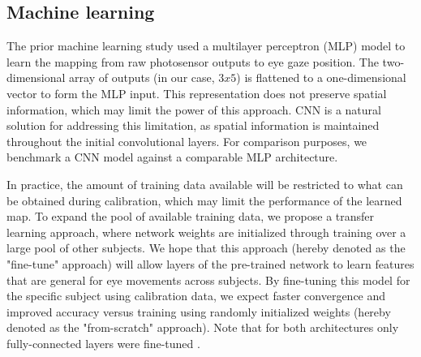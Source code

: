 


\subsection{Machine learning}\label{ssec:ml}

The prior machine learning study used a multilayer perceptron (MLP) model to learn the mapping from raw photosensor outputs to eye gaze position. The two-dimensional array of outputs (in our case, $3x5$) is flattened to a one-dimensional vector to form the MLP input. This representation does not preserve spatial information, which may limit the power of this approach. CNN is a natural solution for addressing this limitation, as spatial information is maintained throughout the initial convolutional layers. For comparison purposes, we benchmark a CNN model against a comparable MLP architecture.  

In practice, the amount of training data available will be restricted to what can be obtained during calibration, which may limit the performance of the learned map. To expand the pool of available training data, we propose a transfer learning approach, where network weights are initialized through training over a large pool of other subjects. We hope that this approach (hereby denoted as the "fine-tune" approach) will allow layers of the pre-trained network to learn features that are general for eye movements across subjects. By fine-tuning this model for the specific subject using calibration data, we expect faster convergence and improved accuracy versus training using randomly initialized weights (hereby denoted as the "from-scratch" approach). Note that for both architectures only fully-connected layers were fine-tuned .


